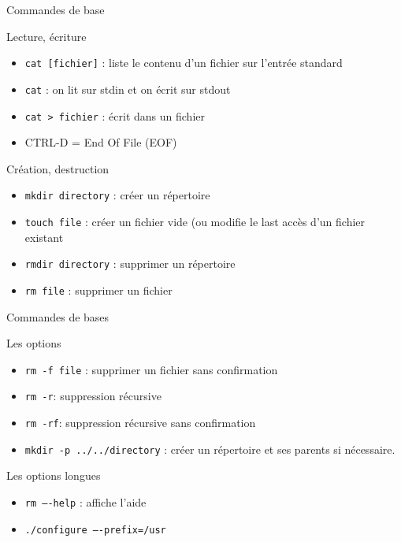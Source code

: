 \begin{frame}{Commandes de base}
\begin{block}{Lecture, écriture}
\begin{itemize}
\item \texttt{cat [fichier]} : liste le contenu d'un fichier sur l'entrée standard
\item \texttt{cat} : on  lit sur stdin et on écrit sur stdout
\item \texttt{cat > fichier} : écrit dans un fichier
\item CTRL-D = End Of File (EOF)
\end{itemize}

 
\end{block}

\begin{block}{Création, destruction}
\begin{itemize}
\item \texttt{mkdir directory} : créer un répertoire
\item \texttt{touch file} : créer un fichier vide (ou modifie le last accès d'un fichier existant
\item \texttt{rmdir directory} : supprimer un répertoire
\item \texttt{rm file} : supprimer un fichier
\end{itemize}
\end{block}
\end{frame}

\begin{frame}{Commandes de bases}
\begin{block}{Les options}
\begin{itemize}
\item \texttt{rm -f file} : supprimer un fichier sans confirmation
\item \texttt{rm -r}: suppression récursive
\item \texttt{rm -rf}: suppression récursive sans confirmation
\item \texttt{mkdir -p ../../directory} : créer un répertoire et ses parents si nécessaire.
\end{itemize}
\end{block}

\begin{block}{Les options longues}
\begin{itemize}
\item \texttt{rm ----help} : affiche l'aide
\item \texttt{./configure ----prefix=/usr}
\end{itemize}
\end{block}
\end{frame}

